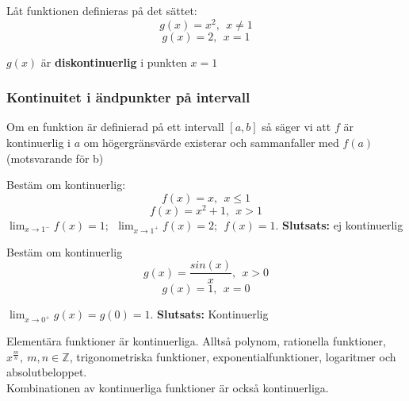 \documentclass{report}
\begin{document}
{
Låt funktionen definieras på det sättet:
\begin{equation*}
g(x) = x^2,\:\:x \ne 1
\end{equation*}
\begin{equation*}
g(x) = 2,\:\:x = 1
\end{equation*}

$ g(x) $ är \textbf{diskontinuerlig} i punkten $ x=1 $ 
}

\subsubsection{Kontinuitet i ändpunkter på intervall}
Om en funktion är definierad på ett intervall $ [a,b] $ så säger vi att $ f $ är kontinuerlig i $ a $ om högergränsvärde existerar och sammanfaller med $ f(a) $ (motsvarande för b)



\vspace{20pt}
\qs{}
{
Bestäm om kontinuerlig:
\begin{equation*}
f(x) = x,\:\: x \le 1
\end{equation*}
\begin{equation*}
	f(x) = x^2+1,\:\: x > 1
\end{equation*}
}
\sol $ \lim_{x \to 1^-} f(x) = 1;\:\: \lim_{x \to 1^+} f(x) = 2;\:\:f(x) = 1   $. \textbf{Slutsats:} ej kontinuerlig 

\vspace{20pt}
\qs{}
{
Bestäm om kontinuerlig
\begin{equation*}
g(x) = \frac{sin(x)}{x},\:\:x > 0
\end{equation*}
\begin{equation*}
g(x) = 1,\:\: x = 0
\end{equation*}
}

\sol $ \lim_{x \to 0^+} g(x) = g(0) = 1 $. \textbf{Slutsats:} Kontinuerlig 

\pagebreak

\noindent
Elementära funktioner är kontinuerliga. Alltså polynom, rationella funktioner, $ x^{ \frac{m}{n} },\:m,n \in \mathbb{Z} $, trigonometriska funktioner, exponentialfunktioner, logaritmer och absolutbeloppet.\\
Kombinationen av kontinuerliga funktioner är också kontinuerliga.\\\\
\end{document}
